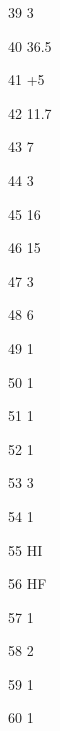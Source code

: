 \begin{loigiaibt}{39}
 3
\end{loigiaibt}
\begin{loigiaibt}{40}
 36.5
\end{loigiaibt}
\begin{loigiaibt}{41}
 +5
\end{loigiaibt}
\begin{loigiaibt}{42}
 11.7
\end{loigiaibt}
\begin{loigiaibt}{43}
 7
\end{loigiaibt}
\begin{loigiaibt}{44}
 3
\end{loigiaibt}
\begin{loigiaibt}{45}
 16
\end{loigiaibt}
\begin{loigiaibt}{46}
 15
\end{loigiaibt}
\begin{loigiaibt}{47}
 3
\end{loigiaibt}
\begin{loigiaibt}{48}
 6
\end{loigiaibt}
\begin{loigiaibt}{49}
 1
\end{loigiaibt}
\begin{loigiaibt}{50}
 1
\end{loigiaibt}
\begin{loigiaibt}{51}
 1
\end{loigiaibt}
\begin{loigiaibt}{52}
 1
\end{loigiaibt}
\begin{loigiaibt}{53}
 3
\end{loigiaibt}
\begin{loigiaibt}{54}
 1
\end{loigiaibt}
\begin{loigiaibt}{55}
 HI
\end{loigiaibt}
\begin{loigiaibt}{56}
 HF
\end{loigiaibt}
\begin{loigiaibt}{57}
 1
\end{loigiaibt}
\begin{loigiaibt}{58}
 2
\end{loigiaibt}
\begin{loigiaibt}{59}
 1
\end{loigiaibt}
\begin{loigiaibt}{60}
 1
\end{loigiaibt}
